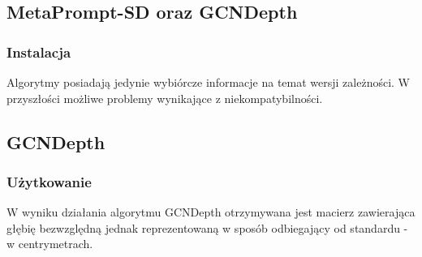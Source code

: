 \subsection{MetaPrompt-SD oraz GCNDepth}
\subsubsection{Instalacja}
Algorytmy posiadają jedynie wybiórcze informacje na temat wersji zależności. W przyszłości możliwe problemy wynikające z niekompatybilności.

\subsection{GCNDepth}
\subsubsection{Użytkowanie}
W wyniku działania algorytmu GCNDepth otrzymywana jest macierz zawierająca głębię bezwzględną jednak reprezentowaną w sposób odbiegający od standardu - w centrymetrach.